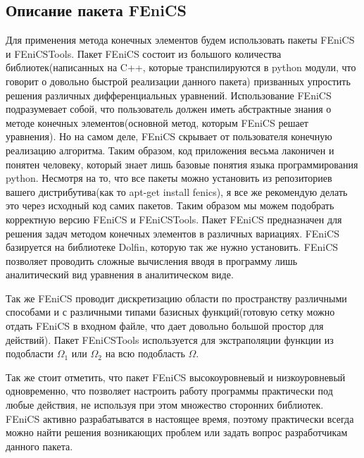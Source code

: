 \subsection{Описание пакета FEniCS}

Для применения метода конечных элементов будем использовать пакеты FEniCS и FEniCSTools.
Пакет FEniCS состоит из большого количества библиотек(написанных на C++, которые транспилируются в python модули, что говорит о довольно быстрой реализации данного пакета) призванных упростить решения различных дифференциальных уравнений. 
Использование FEniCS подразумевает собой, что пользователь должен иметь абстрактные знания о методе конечных элементов(основной метод, которым FEniCS решает уравнения). Но на самом деле, FEniCS скрывает от пользователя конечную реализацию алгоритма. Таким образом, код приложения весьма лаконичен и понятен человеку, который знает лишь базовые понятия языка программирования python.
Несмотря на то, что все пакеты можно установить из репозиториев вашего дистрибутива(как то apt-get install fenics), я все же рекомендую делать это через исходный код самих пакетов. Таким образом мы можем подобрать корректную версию FEniCS и FEniCSTools.
Пакет FEniCS предназначен для решения задач методом конечных элементов в различных вариациях. 
FEniCS базируется на библиотеке Dolfin, которую так же нужно установить. FEniCS позволяет проводить сложные вычисления
вводя в программу лишь аналитический вид уравнения в аналитическом виде.

Так же FEniCS проводит дискретизацию области по пространству различными способами и с различными типами базисных функций(готовую сетку можно отдать FEniCS в входном файле, что дает довольно большой простор для действий). Пакет FEniCSTools используется для экстраполяции функции из подобласти $\Omega_1$ или $\Omega_2$ на всю подобласть $\Omega$.

Так же стоит отметить, что пакет FEniCS высокоуровневый и низкоуровневый одновременно, что позволяет настроить работу программы практически под любые действия, не используя при этом множество сторонних библиотек. FEniCS активно разрабатыватся в настоящее время, поэтому практически всегда можно найти решения возникающих проблем или задать вопрос разработчикам данного пакета.
